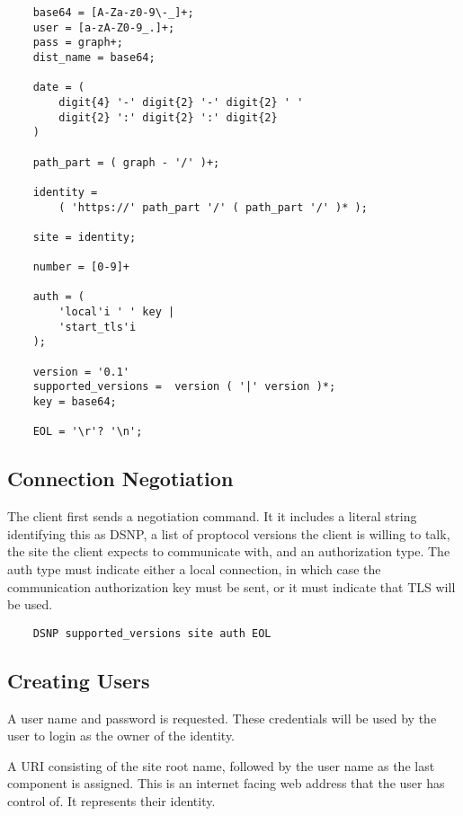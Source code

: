 \documentclass[letterpaper,11pt,oneside]{article}
\begin{document}
\vspace{10pt}
\begin{verbatim}
    base64 = [A-Za-z0-9\-_]+;
    user = [a-zA-Z0-9_.]+;
    pass = graph+;
    dist_name = base64;

    date = (
        digit{4} '-' digit{2} '-' digit{2} ' ' 
        digit{2} ':' digit{2} ':' digit{2} 
    )

    path_part = ( graph - '/' )+;

    identity = 
        ( 'https://' path_part '/' ( path_part '/' )* );

    site = identity;

    number = [0-9]+           

    auth = ( 
        'local'i ' ' key |
        'start_tls'i
    );

    version = '0.1'
    supported_versions =  version ( '|' version )*;
    key = base64;

    EOL = '\r'? '\n';
\end{verbatim}

\subsection{Connection Negotiation}

The client first sends a negotiation command. It it includes a literal string
identifying this as DSNP, a list of proptocol versions the client is willing to
talk, the site the client expects to communicate with, and an authorization
type. The auth type must indicate either a local connection, in which case the
communication authorization key must be sent, or it must indicate that TLS will
be used.

\vspace{10pt}
\begin{verbatim}
    DSNP supported_versions site auth EOL
\end{verbatim}

\subsection{Creating Users}

\vspace{10pt}
A user name and password is requested. These credentials will be used by the
user to login as the owner of the identity.

A URI consisting of the site root name, followed by the user name as the last
component is assigned. This is an internet facing web address that the user has
control of. It represents their identity.
\end{document}
